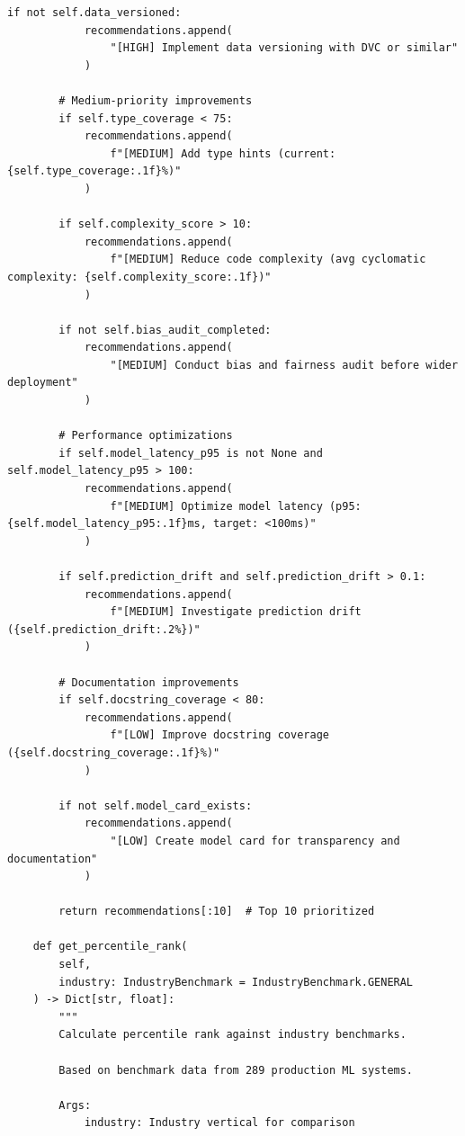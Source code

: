 \begin{lstlisting}[style=python, caption={Comprehensive project health metrics framework with 15+ dimensions}]
        if not self.data_versioned:
            recommendations.append(
                "[HIGH] Implement data versioning with DVC or similar"
            )

        # Medium-priority improvements
        if self.type_coverage < 75:
            recommendations.append(
                f"[MEDIUM] Add type hints (current: {self.type_coverage:.1f}%)"
            )

        if self.complexity_score > 10:
            recommendations.append(
                f"[MEDIUM] Reduce code complexity (avg cyclomatic complexity: {self.complexity_score:.1f})"
            )

        if not self.bias_audit_completed:
            recommendations.append(
                "[MEDIUM] Conduct bias and fairness audit before wider deployment"
            )

        # Performance optimizations
        if self.model_latency_p95 is not None and self.model_latency_p95 > 100:
            recommendations.append(
                f"[MEDIUM] Optimize model latency (p95: {self.model_latency_p95:.1f}ms, target: <100ms)"
            )

        if self.prediction_drift and self.prediction_drift > 0.1:
            recommendations.append(
                f"[MEDIUM] Investigate prediction drift ({self.prediction_drift:.2%})"
            )

        # Documentation improvements
        if self.docstring_coverage < 80:
            recommendations.append(
                f"[LOW] Improve docstring coverage ({self.docstring_coverage:.1f}%)"
            )

        if not self.model_card_exists:
            recommendations.append(
                "[LOW] Create model card for transparency and documentation"
            )

        return recommendations[:10]  # Top 10 prioritized

    def get_percentile_rank(
        self,
        industry: IndustryBenchmark = IndustryBenchmark.GENERAL
    ) -> Dict[str, float]:
        """
        Calculate percentile rank against industry benchmarks.

        Based on benchmark data from 289 production ML systems.

        Args:
            industry: Industry vertical for comparison


\end{lstlisting}
